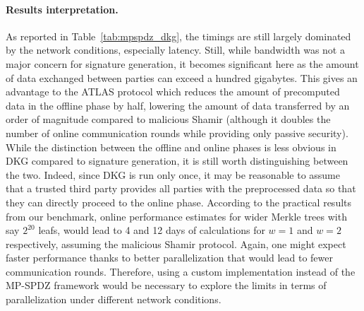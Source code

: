 \paragraph{Results interpretation.}
As reported in Table~\ref{tab:mpspdz_dkg}, the timings are still largely dominated by the network conditions, especially latency.
Still, while bandwidth was not a major concern for signature generation, it becomes significant here as the amount of data exchanged between parties can exceed a hundred gigabytes.
This gives an advantage to the ATLAS protocol which reduces the amount of precomputed data in the offline phase by half, lowering the amount of data transferred by an order of magnitude compared to malicious Shamir (although it doubles the number of online communication rounds while providing only passive security).
While the distinction between the offline and online phases is less obvious in DKG compared to signature generation, it is still worth distinguishing between the two.
Indeed, since DKG is run only once, it may be reasonable to assume that a trusted third party provides all parties with the preprocessed data so that they can directly proceed to the online phase.
According to the practical results from our benchmark, online performance estimates for wider Merkle trees with say  $2^{20}$ leafs, would lead to 4 and 12 days of calculations for $w = 1$ and $w = 2$ respectively, assuming the malicious Shamir protocol.
Again, one might expect faster performance thanks to better parallelization that would lead to fewer communication rounds.
Therefore, using a custom implementation instead of the MP-SPDZ framework would be necessary to explore the limits in terms of parallelization under different network conditions.